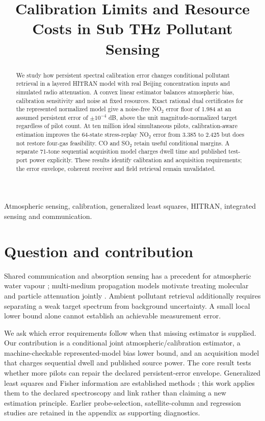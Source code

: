 \documentclass[conference]{IEEEtran}
\title{Calibration Limits and Resource Costs in Sub THz Pollutant Sensing}
\author{
\IEEEauthorblockN{Guillem Moreno Garcia}
\IEEEauthorblockA{
Universitat Polit\`ecnica de Catalunya\\
Email: guillem.moreno.garcia@estudiantat.upc.edu}
}
\begin{document}
\maketitle

\begin{abstract}
We study how persistent spectral calibration error changes conditional pollutant retrieval in a layered HITRAN model with real Beijing concentration inputs and simulated radio attenuation. A convex linear estimator balances atmospheric bias, calibration sensitivity and noise at fixed resources. Exact rational dual certificates for the represented normalized model give a noise-free NO$_2$ error floor of 1.984 at an assumed persistent error of $\pm10^{-4}$ dB, above the unit magnitude-normalized target regardless of pilot count. At ten million ideal simultaneous pilots, calibration-aware estimation improves the 64-state stress-replay NO$_2$ error from 3.385 to 2.425 but does not restore four-gas feasibility. CO and SO$_2$ retain useful conditional margins. A separate 71-tone sequential acquisition model charges dwell time and published test-port power explicitly. These results identify calibration and acquisition requirements; the error envelope, coherent receiver and field retrieval remain unvalidated.
\end{abstract}
\begin{IEEEkeywords}
Atmospheric sensing, calibration, generalized least squares, HITRAN, integrated sensing and communication.
\end{IEEEkeywords}

\section{Question and contribution}
Shared communication and absorption sensing has a precedent for atmospheric water vapour \cite{aliaga2024dar}; multi-medium propagation models motivate treating molecular and particle attenuation jointly \cite{yang2024attenuation}. Ambient pollutant retrieval additionally requires separating a weak target spectrum from background uncertainty. A small local lower bound alone cannot establish an achievable measurement error.

We ask which error requirements follow when that missing estimator is supplied. Our contribution is a conditional joint atmospheric/calibration estimator, a machine-checkable represented-model bias lower bound, and an acquisition model that charges sequential dwell and published source power. The core result tests whether more pilots can repair the declared persistent-error envelope. Generalized least squares and Fisher information are established methods \cite{kay1993}; this work applies them to the declared spectroscopy and link rather than claiming a new estimation principle. Earlier probe-selection, satellite-column and regression studies are retained in the appendix as supporting diagnostics.
\end{document}

